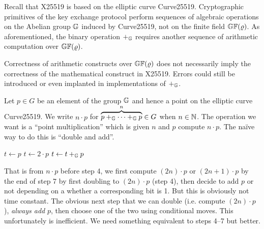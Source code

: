 

Recall that X25519 is based on the elliptic curve Curve25519.
Cryptographic primitives of the key exchange protocol perform
sequences of algebraic operations on the Abelian group $\mathbb{G}$ induced
by Curve25519, not on the finite field $\mathbb{GF}(\varrho)$. As
aforementioned, the binary operation $+_{\mathbb{G}}$ requires another
sequence of arithmetic computation over $\mathbb{GF}(\varrho)$.

Correctness of arithmetic constructs over $\mathbb{GF}(\varrho)$ does not
necessarily imply the correctness of the mathematical construct in
X25519. Errors could still be introduced or even implanted in
implementations of $+_{\mathbb{G}}$.

Let $p \in G$ be an element of the group $\mathbb{G}$ and hence a point on
the elliptic curve Curve25519. We write $n \cdot p$ for
$\overbrace{p +_{\mathbb{G}} \cdots +_{\mathbb{G}} p}^n \in G$ when $n \in \mathbb{N}$.
The operation we want is a ``point multiplication'' which is given $n$
and $p$ compute $n \cdot p$.  The na\"ive way to do this is ``double
and add''.  

\begin{algorithm}[h]
  \begin{algorithmic}[1]  
    \begin{multicols}{2}
      \State $t\leftarrow p$
      \State $t\leftarrow 2\cdot p$
      \State $t\leftarrow t+_{\mathbb{G}} p$
      \EndIf
      \EndFor
      \State {}
      \EndFunction
    \end{multicols}
  \end{algorithmic}
\end{algorithm}
That is from $n \cdot p$ before step 4, we first compute $(2n) \cdot p$
or $(2n+1) \cdot p$ by the end of step 7 by first doubling to
$(2n) \cdot p$ (step 4), then decide to add $p$ or not depending on a
whether a corresponding bit is 1.  But this is obviously not time
constant.  The obvious next step that we can double
(i.e. compute $(2n)\cdot p$), \emph{always add} $p$, then choose one
of the two using conditional moves.  This unfortunately is
inefficient.  We need something equivalent to steps 4--7 but better.

